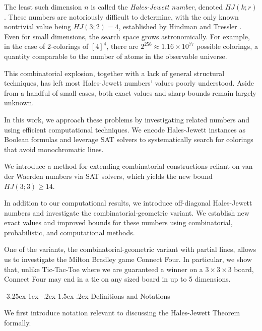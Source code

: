\documentclass[11pt]{article}
\makeatletter
\theoremstyle{definition}
\renewcommand\subsection{\@startsection{subsection}{2}{\z@}%
{-3.25ex\@plus -1ex \@minus -.2ex}%
{1.5ex \@plus .2ex}%
{\normalfont\normalsize\bfseries}}
\makeatother
\begin{document}
 The least such dimension $n$ is called the \textit{Hales-Jewett number}, denoted $HJ(k;r)$. These numbers are notoriously difficult to determine, with the only known nontrivial value being $HJ(3;2) = 4$, established by Hindman and Tressler \cite{HT}. Even for small dimensions, the search space grows astronomically. For example, in the case of 2-colorings of $[4]^4$, there are $2^{256} \approx 1.16 \times 10^{77}$ possible colorings, a quantity comparable to the number of atoms in the observable universe. 

This combinatorial explosion, together with a lack of general structural techniques, has left most Hales-Jewett numbers' values poorly understood. Aside from a handful of small cases, both exact values and sharp bounds remain largely unknown. 

In this work, we approach these problems by investigating related numbers and using efficient computational techniques. We encode Hales-Jewett instances as Boolean formulas and leverage  SAT solvers to systematically search for colorings that avoid monochromatic lines. 

We introduce a method for extending combinatorial constructions reliant on van der Waerden numbers via SAT solvers, which yields the new bound $HJ(3;3) \geq 14$.
 



In addition to our computational results, we introduce  off-diagonal Hales-Jewett numbers and  investigate the combinatorial-geometric variant. We establish new exact values and improved bounds for these numbers using combinatorial, probabilistic, and computational methods.

{
One of the variants, the combinatorial-geometric
variant with partial lines, allows us to investigate the Milton Bradley game Connect Four.  In particular, we
show that, unlike Tic-Tac-Toe where we are
guaranteed a winner on a $3 \times 3 \times 3$ board, Connect Four may end in a tie on
any sized board in up to 5 dimensions.
}




\subsection{Definitions and Notations}

We first introduce notation relevant to discussing the Hales-Jewett Theorem formally. 
\end{document}
